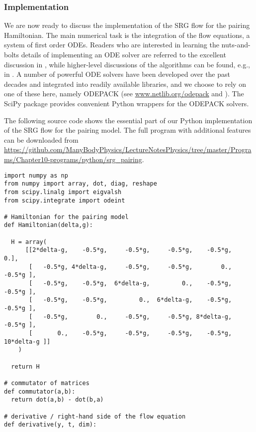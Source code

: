 {\subsubsection{\label{sec:srg_pairing_implementation}Implementation}
We are now ready to discuss the implementation of the SRG flow for the pairing
Hamiltonian. The main numerical task is the integration of the flow equations,
a system of first order ODEs. Readers who are interested in learning the 
nuts-and-bolts details of implementing an ODE solver are referred to the excellent 
discussion in \cite{Press:2007vn}, while higher-level discussions of the algorithms
can be found, e.g., in \cite{Shampine:1975qq,Landau:2012zr,Hjorth-Jensen:2015mz}.
A number of powerful ODE solvers have been developed over the past decades and 
integrated into readily available libraries, and we choose to rely on one of these 
here, namely ODEPACK (see \url{www.netlib.org/odepack} and 
\cite{Hindmarsh:1983pd,Radhakrishnan:1993fk,Brown:1989qd}). The SciPy package
provides convenient Python wrappers for the ODEPACK solvers.

The following source code shows the essential part of our Python implementation of
the SRG flow for the pairing model. The full program with additional features can 
be downloaded from 
\url{https://github.com/ManyBodyPhysics/LectureNotesPhysics/tree/master/Programs/Chapter10-programs/python/srg_pairing}.


\begin{lstlisting}
import numpy as np
from numpy import array, dot, diag, reshape
from scipy.linalg import eigvalsh
from scipy.integrate import odeint

# Hamiltonian for the pairing model
def Hamiltonian(delta,g):

  H = array(
      [[2*delta-g,    -0.5*g,     -0.5*g,     -0.5*g,    -0.5*g,          0.],
       [   -0.5*g, 4*delta-g,     -0.5*g,     -0.5*g,        0.,     -0.5*g ], 
       [   -0.5*g,    -0.5*g,  6*delta-g,         0.,    -0.5*g,     -0.5*g ], 
       [   -0.5*g,    -0.5*g,         0.,  6*delta-g,    -0.5*g,     -0.5*g ], 
       [   -0.5*g,        0.,     -0.5*g,     -0.5*g, 8*delta-g,     -0.5*g ], 
       [       0.,    -0.5*g,     -0.5*g,     -0.5*g,    -0.5*g, 10*delta-g ]]
    )

  return H

# commutator of matrices
def commutator(a,b):
  return dot(a,b) - dot(b,a)

# derivative / right-hand side of the flow equation
def derivative(y, t, dim):


\end{lstlisting}}
